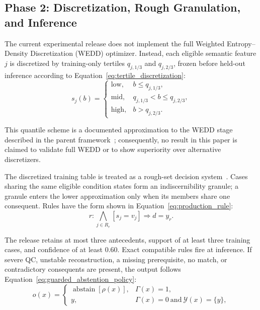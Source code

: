 \documentclass{ceurart}
\begin{document}
\subsection{Phase 2: Discretization, Rough Granulation, and Inference}\label{subsec:discretization_granulation_inference}

The current experimental release does not implement the full Weighted Entropy--Density Discretization (WEDD) optimizer. Instead, each eligible semantic feature \(j\) is discretized by training-only tertiles \(q_{j,1/3}\) and \(q_{j,2/3}\), frozen before held-out inference according to Equation~\eqref{eq:tertile_discretization}:
\begin{equation}
s_j(b)=\begin{cases}
\mathrm{low}, & b\le q_{j,1/3},\\
\mathrm{mid}, & q_{j,1/3}<b\le q_{j,2/3},\\
\mathrm{high}, & b>q_{j,2/3}.
\end{cases}
\label{eq:tertile_discretization}
\end{equation}

This quantile scheme is a documented approximation to the WEDD stage described in the parent framework~\cite{Radiuk2026SEMTRA}; consequently, no result in this paper is claimed to validate full WEDD or to show superiority over alternative discretizers.

The discretized training table is treated as a rough-set decision system~\cite{Pawlak1982Rough}. Cases sharing the same eligible condition states form an indiscernibility granule; a granule enters the lower approximation only when its members share one consequent. Rules have the form shown in Equation~\eqref{eq:production_rule}:
\begin{equation}
r:\bigwedge_{j\in R_r}[s_j=v_j]\Longrightarrow d=y_r .
\label{eq:production_rule}
\end{equation}

The release retains at most three antecedents, support of at least three training cases, and confidence of at least 0.60. Exact compatible rules fire at inference. If severe QC, unstable reconstruction, a missing prerequisite, no match, or contradictory consequents are present, the output follows Equation~\eqref{eq:guarded_abstention_policy}:
\begin{equation}
o(x)=\begin{cases}
\operatorname{abstain}[\rho(x)], & \Gamma(x)=1,\\
y, & \Gamma(x)=0\ \text{and}\ \mathcal{Y}(x)=\{y\},
\end{cases}
\label{eq:guarded_abstention_policy}
\end{equation}
\end{document}
